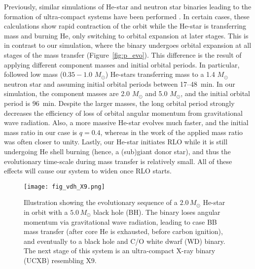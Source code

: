 \documentclass[a4paper,fleqn,usenatbib]{mnras}
\begin{document}
Previously, similar simulations of He-star and neutron star binaries leading to the formation of ultra-compact systems have been performed \citep[e.g.][]{2013A&A...552A..69V, 2013ApJ...768..184H}. In certain cases, these calculations show rapid contraction of the orbit while the He-star is transferring mass and burning He, only switching to orbital expansion at later stages. This is in contrast to our simulation, where the binary undergoes orbital expansion at all stages of the mass transfer (Figure~\ref{fig:p_evo}). This difference is the result of applying different component masses and initial orbital periods. In particular, \citet{2013A&A...552A..69V} followed low mass ($0.35-1.0$ $M_\odot$) He-stars transferring mass to a 1.4 $M_\odot$ neutron star and assuming initial orbital periods between 17--48~min. In our simulation, the component masses are 2.0 $M_\odot$ and 5.0 $M_\odot$, and the initial orbital period is 96~min. Despite the larger masses, the long orbital period strongly decreases the efficiency of loss of orbital angular momentum from gravitational wave radiation. Also, a more massive  He-star evolves much faster, and the initial mass ratio in our case is $q = 0.4$, whereas in the work of \citet{2013A&A...552A..69V} the applied mass ratio was often closer to unity. Lastly, our He-star initiates RLO while it is still undergoing He shell burning (hence, a (sub)giant donor star), and thus the evolutionary time-scale during mass transfer is relatively small. All of these effects will cause our system to widen once RLO starts.

\begin{figure}
	\texttt{[image: fig\_vdh\_X9.png]}
	\caption{Illustration showing the evolutionary sequence of a $2.0\,M_\odot$ He-star in orbit with a $5.0\,M_\odot$ black hole (BH). The binary loses angular momentum via gravitational wave radiation, leading to case BB mass transfer (after core He is exhausted, before carbon ignition), and eventually to a black hole and C/O white dwarf (WD) binary. The next stage of this system is an ultra-compact X-ray binary (UCXB) resembling X9.}
	\label{fig:cartoon}
\end{figure}
\end{document}
